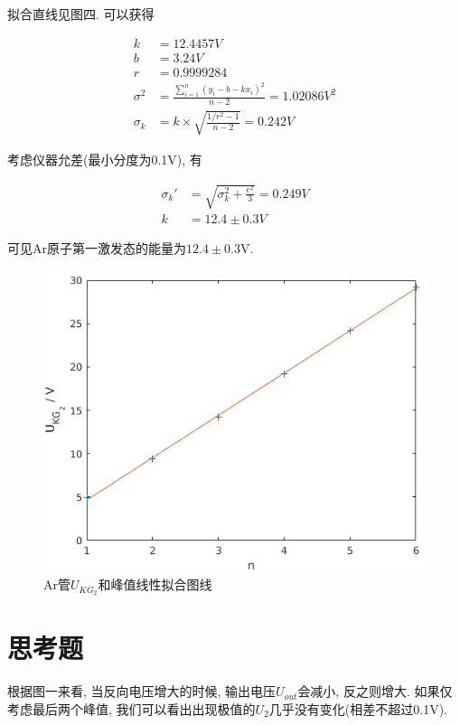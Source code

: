 \documentclass[a4paper,10pt,notitlepage]{article}
\begin{document}
	拟合直线见图四. 可以获得 
	
\begin{align*}
	k &= 12.4457 V \\
	b &= 3.24V \\
	r &= 0.9999284 \\
	\sigma^2 &= \frac{\sum_{i = 1}^{n}(y_i - b - kx_i)^2}{n - 2} = 1.02086 V^2 \\
	\sigma_k &= k \times \sqrt{\frac{1/r^2 - 1}{n - 2}} = 0.242V 
\end{align*}
	
	考虑仪器允差(最小分度为0.1V), 有
	
\begin{align*}
	\sigma_k' &= \sqrt{\sigma_k ^ 2 + \frac{e^2}{3}} = 0.249V \\
	k &= 12.4 \pm 0.3 V
\end{align*}

	可见Ar原子第一激发态的能量为$12.4 \pm 0.3$V. \\
	
\begin{figure}
	\includegraphics[scale=0.76]{fh4.png}
	\caption{Ar管$U_{KG_2}$和峰值线性拟合图线}
\end{figure}

\section{思考题}

	根据图一来看, 当反向电压增大的时候, 输出电压$U_{out}$会减小, 反之则增大. 如果仅考虑最后两个峰值, 我们可以看出出现极值的$U_2$几乎没有变化(相差不超过0.1V). \\
	
\end{document}
